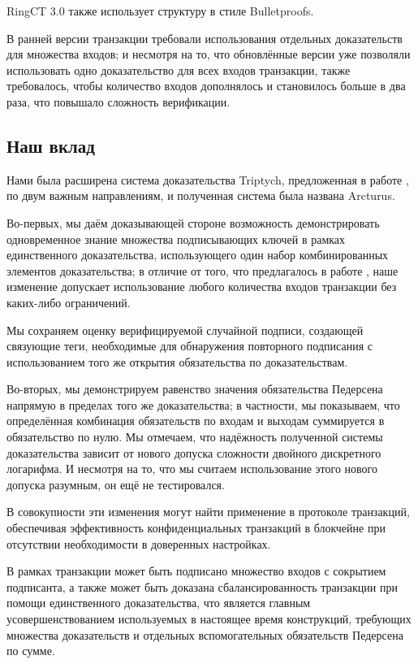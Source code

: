 \documentclass{article}
\theoremstyle{definition}
\begin{document}
RingCT 3.0 \cite{rct3} также использует структуру в стиле Bulletproofs.

В ранней версии транзакции требовали использования отдельных доказательств для множества входов; и несмотря на то, что обновлённые версии уже позволяли использовать одно доказательство для всех входов транзакции, также требовалось, чтобы количество входов дополнялось и становилось больше в два раза, что повышало сложность верификации.


\subsection{Наш вклад}
Нами была расширена система доказательства Triptych, предложенная в работе \cite{triptych}, по двум важным направлениям, и полученная система была названа Arcturus.

Во-первых, мы даём доказывающей стороне возможность демонстрировать одновременное знание множества подписывающих ключей в рамках единственного доказательства, использующего один набор комбинированных элементов доказательства; в отличие от того, что предлагалось в работе \cite{rct3}, наше изменение допускает использование любого количества входов транзакции без каких-либо ограничений.

Мы сохраняем оценку верифицируемой случайной подписи, создающей связующие теги, необходимые для обнаружения повторного подписания с использованием того же открытия обязательства по доказательствам.

Во-вторых, мы демонстрируем равенство значения обязательства Педерсена напрямую в пределах того же доказательства; в частности, мы показываем, что определённая комбинация обязательств по входам и выходам суммируется в обязательство по нулю. Мы отмечаем, что надёжность полученной системы доказательства зависит от нового допуска сложности двойного дискретного логарифма. И несмотря на то, что мы считаем использование этого нового допуска разумным, он ещё не тестировался.

В совокупности эти изменения могут найти применение в протоколе транзакций, обеспечивая эффективность конфиденциальных транзакций в блокчейне при отсутствии необходимости в доверенных настройках.

В рамках транзакции может быть подписано множество входов с сокрытием подписанта, а также может быть доказана сбалансированность транзакции при помощи единственного доказательства, что является главным усовершенствованием используемых в настоящее время конструкций, требующих множества доказательств и отдельных вспомогательных обязательств Педерсена по сумме.
\end{document}
